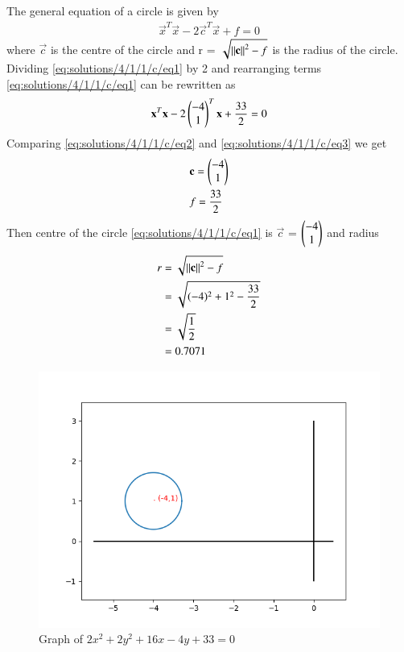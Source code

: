 
The general equation of a circle is given by
\begin{align}
  \vec{x}^T\vec{x}-2\vec{c}^T\vec{x}+f = 0 \label{eq:solutions/4/1/1/c/eq2}
\end{align}
where $\vec{c}$ is the centre of the circle and r = $\sqrt{\left\lVert\mathbf{c}\right\rVert^2-f}$ is the radius of the circle.
Dividing \eqref{eq:solutions/4/1/1/c/eq1} by 2 and rearranging terms \eqref{eq:solutions/4/1/1/c/eq1} can be rewritten as 
\begin{align}
  \mathbf{x}^T\mathbf{x}-2\begin{pmatrix}-4\\1\end{pmatrix}^T\mathbf{x}+\frac{33}{2} = 0 \label{eq:solutions/4/1/1/c/eq3}
\end{align}
Comparing \eqref{eq:solutions/4/1/1/c/eq2} and \eqref{eq:solutions/4/1/1/c/eq3} we get
\begin{align}
  &\mathbf{c} = \begin{pmatrix}-4\\1\end{pmatrix}\\
  &f = \frac{33}{2}
\end{align}
Then centre of the circle \eqref{eq:solutions/4/1/1/c/eq1} is $\vec{c}$ = $\begin{pmatrix}-4\\1\end{pmatrix}$ and radius
\begin{align}
  r &= \sqrt{\left\lVert\mathbf{c}\right\rVert^2-f}\\
  &= \sqrt{(-4)^2+1^2-\frac{33}{2}}\\
  &= \sqrt{\frac{1}{2}}\\
  &= 0.7071
\end{align}
  \begin{figure}[!ht]
	\centering
	\includegraphics[width=\columnwidth]{./solutions/4/1/1/c/circle.png}
	\caption{Graph of $2x^2+2y^2+16x-4y+33=0$}
	\label{eq:solutions/4/1/1/c/myfig}
\end{figure}
